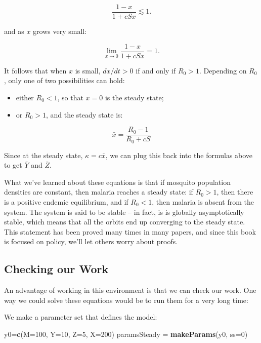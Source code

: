 \documentclass[
]{book}
\newenvironment{Shaded}{\begin{snugshade}}{\end{snugshade}}
\newcommand{\AttributeTok}[1]{\textcolor[rgb]{0.13,0.29,0.53}{#1}}
\newcommand{\DecValTok}[1]{\textcolor[rgb]{0.00,0.00,0.81}{#1}}
\newcommand{\FunctionTok}[1]{\textcolor[rgb]{0.13,0.29,0.53}{\textbf{#1}}}
\newcommand{\NormalTok}[1]{#1}
\newcommand{\OtherTok}[1]{\textcolor[rgb]{0.56,0.35,0.01}{#1}}
\begin{document}
\begin{equation}
\frac{1-x}{1 + cSx} \lesssim 1. 
\end{equation}

and as \(x\) grows very small:

\begin{equation}
\lim_{x \rightarrow 0} \frac{1-x}{1 + cSx} = 1. 
\end{equation}

It follows that when \(x\) is small, \(dx/dt>0\) if and only if \(R_0 > 1\). Depending on \(R_0\), only one of two possibilities can hold:

\begin{itemize}
\item
  either \(R_0<1\), so that \(x=0\) is the steady state;
\item
  or \(R_0 > 1\), and the steady state is:
\end{itemize}

\begin{equation}
\bar x = \frac{R_0 -1}{R_0 + c S} 
\end{equation}

Since at the steady state, \(\kappa = c \bar x\), we can plug this back into the formulas above to get \(\bar Y\) and \(\bar Z\).

What we've learned about these equations is that if mosquito population densities are constant, then malaria reaches a steady state: if \(R_0 >1\), then there is a positive endemic equilibrium, and if \(R_0 < 1\), then malaria is absent from the system. The system is said to be stable -- in fact, is is globally asymptotically stable, which means that all the orbits end up converging to the steady state. This statement has been proved many times in many papers, and since this book is focused on policy, we'll let others worry about proofs.

\subsection{Checking our Work}\label{checking-our-work}

An advantage of working in this environment is that we can check our work. One way we could solve these equations would be to run them for a very long time:

We make a parameter set that defines the model:

\begin{Shaded}
\begin{Highlighting}[]
\NormalTok{y0}\OtherTok{=}\FunctionTok{c}\NormalTok{(}\AttributeTok{M=}\DecValTok{100}\NormalTok{, }\AttributeTok{Y=}\DecValTok{10}\NormalTok{, }\AttributeTok{Z=}\DecValTok{5}\NormalTok{, }\AttributeTok{X=}\DecValTok{200}\NormalTok{)}
\NormalTok{paramsSteady }\OtherTok{=} \FunctionTok{makeParams}\NormalTok{(y0, }\AttributeTok{ss=}\DecValTok{0}\NormalTok{)}
\end{Highlighting}
\end{Shaded}
\end{document}
